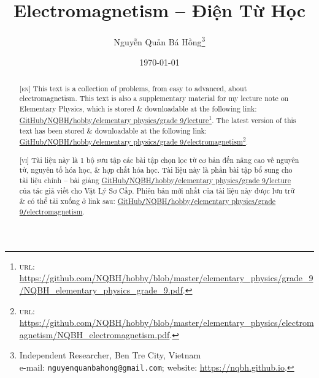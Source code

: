 \documentclass{article}
\title{Electromagnetism -- Điện Từ Học}
\author{Nguyễn Quản Bá Hồng\footnote{Independent Researcher, Ben Tre City, Vietnam\\e-mail: \texttt{nguyenquanbahong@gmail.com}; website: \url{https://nqbh.github.io}.}}
\date{\today}
\begin{document}
\maketitle
\begin{abstract}
	\textsc{[en]} This text is a collection of problems, from easy to advanced, about electromagnetism. This text is also a supplementary material for my lecture note on Elementary Physics, which is stored \& downloadable at the following link: \href{https://github.com/NQBH/hobby/blob/master/elementary_physics/grade_9/NQBH_elementary_physics_grade_9.pdf}{GitHub\texttt{/}NQBH\texttt{/}hobby\texttt{/}elementary physics\texttt{/}grade 9\texttt{/}lecture}\footnote{\textsc{url}: \url{https://github.com/NQBH/hobby/blob/master/elementary_physics/grade_9/NQBH_elementary_physics_grade_9.pdf}.}. The latest version of this text has been stored \& downloadable at the following link:\\\href{https://github.com/NQBH/hobby/blob/master/elementary_physics/electromagnetism/NQBH_electromagnetism.pdf}{GitHub\texttt{/}NQBH\texttt{/}hobby\texttt{/}elementary physics\texttt{/}grade 9\texttt{/}electromagnetism}\footnote{\textsc{url}: \url{https://github.com/NQBH/hobby/blob/master/elementary_physics/electromagnetism/NQBH_electromagnetism.pdf}.}.
	\vspace{2mm}
	
	\textsc{[vi]} Tài liệu này là 1 bộ sưu tập các bài tập chọn lọc từ cơ bản đến nâng cao về nguyên tử, nguyên tố hóa học, \& hợp chất hóa học. Tài liệu này là phần bài tập bổ sung cho tài liệu chính -- bài giảng \href{https://github.com/NQBH/hobby/blob/master/elementary_physics/grade_9/NQBH_elementary_physics_grade_9.pdf}{GitHub\texttt{/}NQBH\texttt{/}hobby\texttt{/}elementary physics\texttt{/}grade 9\texttt{/}lecture} của tác giả viết cho Vật Lý Sơ Cấp. Phiên bản mới nhất của tài liệu này được lưu trữ \& có thể tải xuống ở link sau: \href{https://github.com/NQBH/hobby/blob/master/elementary_physics/grade_9/real/NQBH_real.pdf}{GitHub\texttt{/}NQBH\texttt{/}hobby\texttt{/}elementary physics\texttt{/}grade 9\texttt{/}electromagnetism}.
\end{abstract}
\setcounter{secnumdepth}{4}
\setcounter{tocdepth}{3}
\tableofcontents
\newpage





\printbibliography[heading=bibintoc]
	
\end{document}
